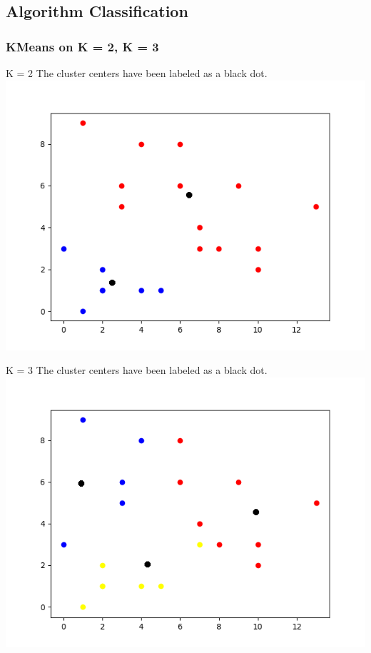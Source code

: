 \documentclass{article}
\begin{document}
	\subsection{Algorithm Classification}
	\subsubsection{KMeans on K = 2, K = 3}

	\begin{center}
		K = 2 The cluster centers have been labeled as a black dot.
		\includegraphics[scale=.8]{KMeans_K=2C.png}
	\end{center}
	\begin{center}
			K = 3 The cluster centers have been labeled as a black dot.
			\includegraphics[scale=.8]{KMeans_K=3C.png}
	\end{center}
\end{document}
